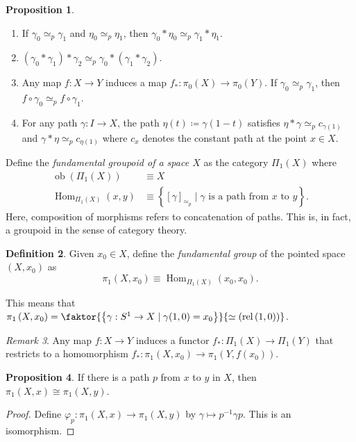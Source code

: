 \documentclass[10pt,letterpaper,cm]{nupset}
\theoremstyle{definition}
\newtheorem{definition}{Definition}[subsection]
\theoremstyle{theorem}
\newtheorem{prop}[definition]{Proposition}
\theoremstyle{remark}
\newtheorem{remark}[definition]{Remark}
\newcommand{\1}{\mathbb{1}}
\newcommand{\0}{\vec 0}
\DeclareMathOperator{\Hom}{Hom}
\DeclareMathOperator{\ob}{ob}
\DeclareMathOperator{\rel}{rel}
\begin{document}
\begin{prop} $ $
\begin{enumerate}
\item If $\gamma_0 \simeq_p \gamma_1$ and $\eta_0 \simeq_p \eta_1$, then $\gamma_0 \ast \eta_0 \simeq_p \gamma_1 \ast \eta_1$.
\item $\left(\gamma_0 \ast \gamma_1\right)\ast \gamma_2 \simeq_p \gamma_0 \ast \left(\gamma_1 \ast \gamma_2\right)$.
\item Any map $f: X \to Y$ induces a map $f_{\ast} : \pi_0(X) \to \pi_0(Y)$. If $\gamma_0 \simeq_p \gamma_1$, then $f\circ \gamma_0 \simeq_p f\circ \gamma_1$.
\item For any path $\gamma : I \to X$, the path $\eta(t) \coloneqq  \gamma(1-t)$ satisfies $\eta \ast \gamma \simeq_p c_{\gamma(1)}$ and $\gamma \ast \eta \simeq_p c_{\eta(1)}$ where $c_x$ denotes the constant path at the point $x\in X$.
\end{enumerate}
\end{prop}


\smallskip

Define the \textit{fundamental groupoid of a space $X$} as the category $\Pi_1(X)$ where
\begin{align*}
\ob(\Pi_1(X)) & \equiv X
\\ \Hom_{\Pi_1(X)}(x,y) & \equiv \left\{\left[\gamma\right]_{\simeq_p} \mid \gamma \text{ is a path from }x \text{ to }y\right\}.
\end{align*}
 Here, composition of morphisms refers to concatenation of paths. 
This is, in fact, a groupoid in the sense of category theory.


\begin{definition}
Given $x_0 \in X$, define the \textit{fundamental group} of the pointed space $\left(X, x_0\right)$ as $$\pi_1\left(X, x_0\right) \equiv \Hom_{\Pi_1(X)}(x_0,x_0) .$$ 
\end{definition}

This means that $\pi_1\left(X, x_0\right) =  \faktor{\left\{\gamma : S^1 \to X \mid \gamma(1,0) =x_0\right\}}{\simeq \left(\rel{ \left(1,0\right)}\right)}$.

\smallskip

\begin{remark}
Any map $f: X \to Y$ induces a functor $f_{\ast} : \Pi_1(X) \to \Pi_1(Y)$ that restricts to a homomorphism $f_{\ast} : \pi_1\left(X, x_0\right) \to \pi_1(Y, f(x_0))$.
\end{remark}

\begin{prop}
If there is a path $p$ from $x$ to $y$ in $X$, then $\pi_1(X, x) \cong \pi_1(X, y)$.
\end{prop}
\begin{proof}
Define $\varphi_p : \pi_1(X, x) \to \pi_1(X, y)$ by $\gamma \mapsto p^{-1} \gamma p$. This is an isomorphism. 
\end{proof}
\end{document}
